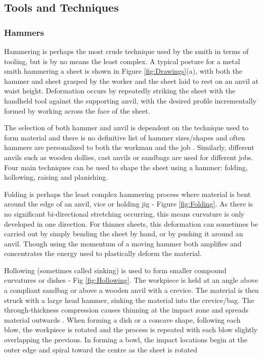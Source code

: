 \subsection{Tools and Techniques} \label{sec:ToolsandTech}
\subsubsection*{Hammers}

Hammering is perhaps the most crude technique used by the smith in terms of tooling, but is by no means the least complex. A typical posture for a metal smith hammering a sheet is shown in Figure \ref{fig:Drawings}(a), with both the hammer and sheet grasped by the worker and the sheet laid to rest on an anvil at waist height. Deformation occurs by repeatedly striking the sheet with the handheld tool against the supporting anvil, with the desired profile incrementally formed by working across the face of the sheet.

The selection of both hammer and anvil is dependent on the technique used to form material and there is no definitive list of hammer sizes/shapes and often hammers are personalized to both the workman and the job \citep{Barr2013ProfessionalFabrication}. Similarly, different anvils such as wooden dollies, cast anvils or sandbags are used for different jobs. Four main techniques can be used to shape the sheet using a hammer: folding, hollowing, raising and planishing. 

Folding is perhaps the least complex hammering process where material is bent around the edge of an anvil, vice or holding jig - Figure \ref{fig:Folding}. As there is no significant bi-directional stretching occurring, this means curvature is only developed in one direction. For thinner sheets, this deformation can sometimes be carried out by simply bending the sheet by hand, or by pushing it around an anvil. Though using the momentum of a moving hammer both amplifies and concentrates the energy used to plastically deform the material. 

Hollowing (sometimes called sinking) is used to form smaller compound curvatures or dishes - Fig \ref{fig:Hollowing}. The workpiece is held at an angle above a compliant sandbag or above a wooden anvil with a crevice. The material is then struck with a large head hammer, sinking the material into the crevice/bag. The through-thickness compression causes thinning at the impact zone and spreads material outwards \citep{Music2012TheTools}. When forming a dish or a concave shape, following each blow, the workpiece is rotated and the process is repeated with each blow slightly overlapping the previous. In forming a bowl, the impact locations begin at the outer edge and spiral toward the centre as the sheet is rotated

